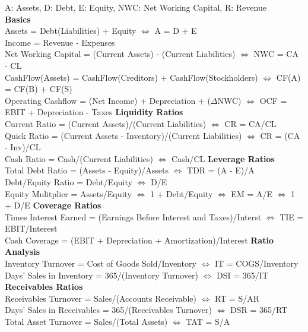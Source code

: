 \documentclass{letter}
\begin{document}
A: Assets, D: Debt, E: Equity, NWC: Net Working Capital, R: Revenue \\
\textbf{Basics} \\
Assets = Debt(Liabilities) + Equity $\iff$ A = D + E \\
Income = Revenue - Expenses \\
Net Working Capital = (Current Assets) - (Current Liabilities) $\iff$ NWC = CA - CL \\
CashFlow(Assets) = CashFlow(Creditors) + CashFlow(Stockholders) $\iff$ CF(A) = CF(B) + CF(S) \\
Operating Cashflow = (Net Income) + Depreciation + ($\Delta$NWC) $\iff$ OCF = EBIT + Depreciation - Taxes
\newline
\textbf{Liquidity Ratios} \\
Current Ratio = (Current Assets)/(Current Liabilities) $\iff$ CR = CA/CL \\
Quick Ratio = (Current Assets - Inventory)/(Current Liabilities) $\iff$ CR = (CA - Inv)/CL \\
Cash Ratio = Cash/(Current Liabilities) $\iff$ Cash/CL
\newline
\textbf{Leverage Ratios} \\
Total Debt Ratio = (Assets - Equity)/Assets $\iff$ TDR = (A - E)/A \\
Debt/Equity Ratio = Debt/Equity $\iff$ D/E \\
Equity Mulitplier = Assets/Equity $\iff$ 1 + Debt/Equity $\iff$ EM = A/E $\iff$ 1 + D/E
\newline
\textbf{Coverage Ratios} \\
Times Interest Earned = (Earnings Before Interest and Taxes)/Interst $\iff$ TIE = EBIT/Interest \\
Cash Coverage = (EBIT + Depreciation + Amortization)/Interest
\newline
\textbf{Ratio Analysis} \\
Inventory Turnover = Cost of Goods Sold/Inventory $\iff$ IT = COGS/Inventory \\
Days' Sales in Inventory = 365/(Inventory Turnover) $\iff$ DSI = 365/IT
\newline
\textbf{Receivables Ratios} \\
Receivables Turnover = Sales/(Accounts Receivable) $\iff$ RT = S/AR \\
Days' Sales in Receivables = 365/(Receivables Turnover) $\iff$ DSR = 365/RT \\
Total Asset Turnover = Sales/(Total Assets) $\iff$ TAT = S/A
\newline
\end{document}
